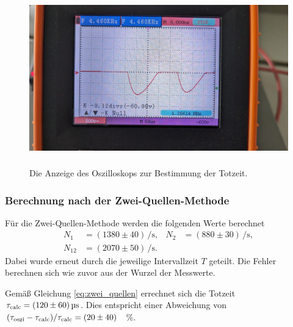 \begin{figure}[H]
    \centering
    \includegraphics[height = 7.5cm]{Abbildungen/totzeit.jpg}
    \caption{Die Anzeige des Oszilloskops zur Bestimmung der Totzeit.}
    \label{fig:totzeit_oszi}
\end{figure}

\subsubsection[]{Berechnung nach der Zwei-Quellen-Methode}
Für die Zwei-Quellen-Methode werden die folgenden Werte berechnet
\begin{align*}
    N_1 &= (1380 \pm 40) \, \unit{\per\second}, &
    N_2 &=  (880 \pm 30) \, \unit{\per\second}, \\
    N_{12} &= (2070 \pm 50) \, \unit{\per\second}.
\end{align*}
Dabei wurde erneut durch die jeweilige Intervallzeit $T$ geteilt.
Die Fehler berechnen sich wie zuvor aus der Wurzel der Messwerte.

\noindent
Gemäß Gleichung \eqref{eq:zwei_quellen} errechnet sich die Totzeit $\tau_\text{calc} = \qty[]{120 +- 60}{\micro\second}$.
Dies entspricht einer Abweichung von $(\tau_\text{oszi} - \tau_\text{calc}) / \tau_\text{calc} = (\num[]{20+-40})$ \, \%.

